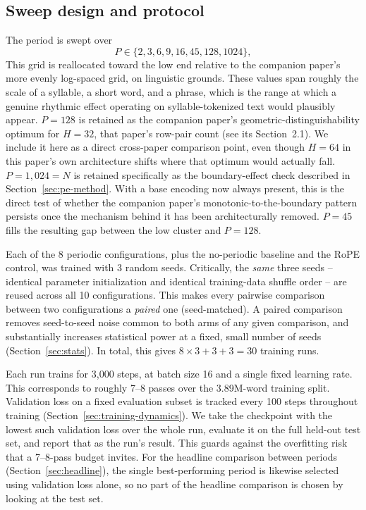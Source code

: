 \documentclass[11pt]{article}
\begin{document}
\subsection{Sweep design and protocol}
\label{sec:sweep}

The period is swept over
\[
P \in \{2, 3, 6, 9, 16, 45, 128, 1024\},
\]
This grid is reallocated toward the low end relative to the companion paper's more evenly log-spaced grid, on linguistic grounds. These values span roughly the scale of a syllable, a short word, and a phrase, which is the range at which a genuine rhythmic effect operating on syllable-tokenized text would plausibly appear. $P=128$ is retained as the companion paper's geometric-distinguishability optimum for $H=32$, that paper's row-pair count (see its Section~2.1). We include it here as a direct cross-paper comparison point, even though $H=64$ in this paper's own architecture shifts where that optimum would actually fall. $P=1{,}024 = N$ is retained specifically as the boundary-effect check described in Section~\ref{sec:pe-method}. With a base encoding now always present, this is the direct test of whether the companion paper's monotonic-to-the-boundary pattern persists once the mechanism behind it has been architecturally removed. $P=45$ fills the resulting gap between the low cluster and $P=128$.

Each of the 8 periodic configurations, plus the no-periodic baseline and the RoPE control, was trained with 3 random seeds. Critically, the \emph{same} three seeds -- identical parameter initialization and identical training-data shuffle order -- are reused across all 10 configurations. This makes every pairwise comparison between two configurations a \emph{paired} one (seed-matched). A paired comparison removes seed-to-seed noise common to both arms of any given comparison, and substantially increases statistical power at a fixed, small number of seeds (Section~\ref{sec:stats}). In total, this gives $8 \times 3 + 3 + 3 = 30$ training runs.

Each run trains for 3{,}000 steps, at batch size 16 and a single fixed learning rate. This corresponds to roughly 7--8 passes over the 3.89M-word training split. Validation loss on a fixed evaluation subset is tracked every 100 steps throughout training (Section~\ref{sec:training-dynamics}). We take the checkpoint with the lowest such validation loss over the whole run, evaluate it on the full held-out test set, and report that as the run's result. This guards against the overfitting risk that a 7--8-pass budget invites. For the headline comparison between periods (Section~\ref{sec:headline}), the single best-performing period is likewise selected using validation loss alone, so no part of the headline comparison is chosen by looking at the test set.
\end{document}
